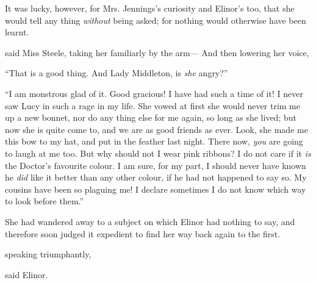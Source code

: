 
It was lucky, however, for Mrs. Jennings's curiosity and Elinor's too, that she would tell any thing {\em without} being asked; for nothing would otherwise have been learnt.

 said Miss Steele, taking her familiarly by the arm--- And then lowering her voice, 


“That is a good thing. And Lady Middleton, is {\em she} angry?”


“I am monstrous glad of it. Good gracious! I have had such a time of it! I never saw Lucy in such a rage in my life. She vowed at first she would never trim me up a new bonnet, nor do any thing else for me again, so long as she lived; but now she is quite come to, and we are as good friends as ever. Look, she made me this bow to my hat, and put in the feather last night. There now, {\em you} are going to laugh at me too. But why should not I wear pink ribbons? I do not care if it {\em is} the Doctor's favourite colour. I am sure, for my part, I should never have known he {\em did} like it better than any other colour, if he had not happened to say so. My cousins have been so plaguing me! I declare sometimes I do not know which way to look before them.”

She had wandered away to a subject on which Elinor had nothing to say, and therefore soon judged it expedient to find her way back again to the first.

 speaking triumphantly, 

 said Elinor.

